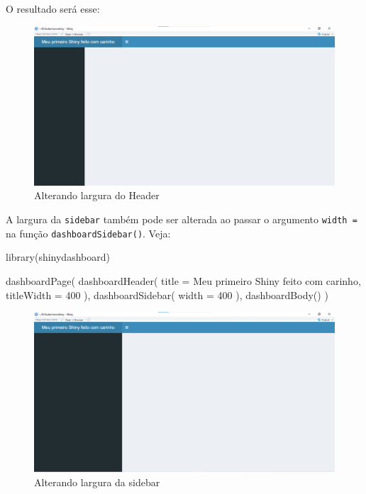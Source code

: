 \documentclass[
]{book}
\newenvironment{Shaded}{\begin{snugshade}}{\end{snugshade}}
\newcommand{\AttributeTok}[1]{\textcolor[rgb]{0.77,0.63,0.00}{#1}}
\newcommand{\DecValTok}[1]{\textcolor[rgb]{0.00,0.00,0.81}{#1}}
\newcommand{\FunctionTok}[1]{\textcolor[rgb]{0.00,0.00,0.00}{#1}}
\newcommand{\NormalTok}[1]{#1}
\newcommand{\StringTok}[1]{\textcolor[rgb]{0.31,0.60,0.02}{#1}}
\begin{document}
O resultado será esse:

\begin{figure}
\centering
\includegraphics{./imagens/cap10imagem8.png}
\caption{Alterando largura do Header}
\end{figure}

A largura da \texttt{sidebar} também pode ser alterada ao passar o argumento \texttt{width\ =} na função \texttt{dashboardSidebar()}. Veja:

\begin{Shaded}
\begin{Highlighting}[]
\FunctionTok{library}\NormalTok{(shinydashboard)}

\FunctionTok{dashboardPage}\NormalTok{(}
  \FunctionTok{dashboardHeader}\NormalTok{(}
    \AttributeTok{title =} \StringTok{\textquotesingle{}Meu primeiro Shiny feito com carinho\textquotesingle{}}\NormalTok{,}
    \AttributeTok{titleWidth =} \DecValTok{400}
\NormalTok{  ),}
  \FunctionTok{dashboardSidebar}\NormalTok{(}
    \AttributeTok{width =} \DecValTok{400}
\NormalTok{  ),}
  \FunctionTok{dashboardBody}\NormalTok{()}
\NormalTok{)}
\end{Highlighting}
\end{Shaded}

\begin{figure}
\centering
\includegraphics{./imagens/cap10imagem9.png}
\caption{Alterando largura da sidebar}
\end{figure}
\end{document}
